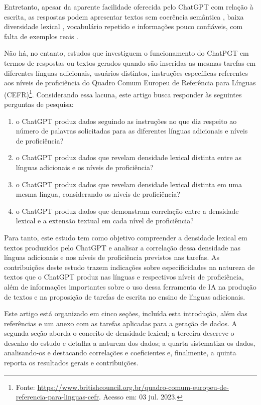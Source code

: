 \documentclass[portuguese]{textolivre}
\begin{document}
Entretanto, apesar da aparente facilidade oferecida pelo ChatGPT com relação à escrita, as respostas podem apresentar textos sem coerência semântica \cite{perkins_academic_2023,dale_gpt-3:_2021}, baixa diversidade lexical \cite{gehrmann_gltr:_2019}, vocabulário repetido \cite{dehouche_plagiarism_2021,frohling_feature-based_2021} e informações pouco confiáveis, com falta de exemplos reais \cite{kumar_analysis_2023}. 

Não há, no entanto, estudos que investiguem o funcionamento do ChatPGT em termos de respostas ou textos gerados quando são inseridas as mesmas tarefas em diferentes línguas adicionais, usuários distintos, instruções específicas referentes aos níveis de proficiência do Quadro Comum Europeu de Referência para Línguas (CEFR)\footnote{Fonte: \url{https://www.britishcouncil.org.br/quadro-comum-europeu-de-referencia-para-linguas-cefr}. Acesso em: 03 jul. 2023.}. Considerando essa lacuna, este artigo busca responder às seguintes perguntas de pesquisa: 

\begin{enumerate}[label=\alph*.]
    \item o ChatGPT produz dados seguindo as instruções no que diz respeito ao número de palavras solicitadas para as diferentes línguas adicionais e níveis de proficiência?
    \item o ChatGPT produz dados que revelam densidade lexical distinta entre as línguas adicionais e os níveis de proficiência?
    \item o ChatGPT produz dados que revelam densidade lexical distinta em uma mesma língua, considerando os níveis de proficiência?
    \item o ChatGPT produz dados que demonstram correlação entre a densidade lexical e a extensão textual em cada nível de proficiência?
\end{enumerate}

Para tanto, este estudo tem como objetivo compreender a densidade lexical em textos produzidos pelo ChatGPT e analisar a correlação dessa densidade nas línguas adicionais e nos níveis de proficiência previstos nas tarefas. As contribuições deste estudo trazem indicações sobre especificidades na natureza de textos que o ChatGPT produz nas línguas e respectivos níveis de proficiência, além de informações importantes sobre o uso dessa ferramenta de IA na produção de textos e na proposição de tarefas de escrita no ensino de línguas adicionais.

Este artigo está organizado em cinco seções, incluída esta introdução, além das referências e um anexo com as tarefas aplicadas para a geração de dados. A segunda seção aborda o conceito de densidade lexical; a terceira descreve o desenho do estudo e detalha a natureza dos dados; a quarta sistematiza os dados, analisando-os e destacando correlações e coeficientes e, finalmente, a quinta reporta os resultados gerais e contribuições.
\end{document}
